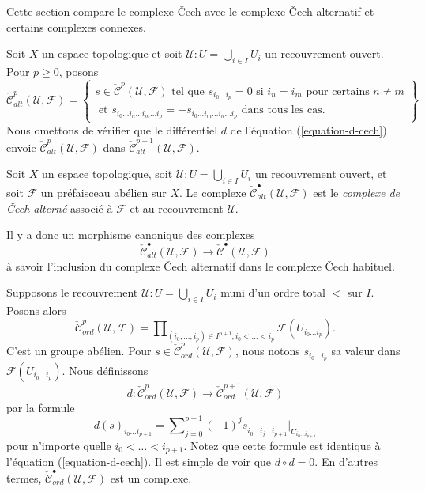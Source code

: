 \noindent
Cette section compare le complexe {\v C}ech avec le complexe {\v C}ech alternatif et certains complexes connexes.

\medskip\noindent
Soit $X$ un espace topologique et soit $\mathcal{U} : U = \bigcup_{i \in I} U_i$ un recouvrement ouvert. Pour $p \geq 0$, posons $$
\check{\mathcal{C}}_{alt}^p(\mathcal{U}, \mathcal{F})
=
\left\{
\begin{matrix}
s \in  \check{\mathcal{C}}^p(\mathcal{U}, \mathcal{F})
\text{ tel que }
s_{i_0 \ldots i_p} = 0 \text{ si } i_n = i_m \text{ pour certains } n \not = m\\
\text{ et }
s_{i_0\ldots i_n \ldots i_m \ldots i_p}
=
-s_{i_0\ldots i_m \ldots i_n \ldots i_p}
\text{ dans tous les cas.}
\end{matrix}
\right\}
$$ Nous omettons de vérifier que le différentiel $d$ de l'équation (\ref{equation-d-cech}) envoie $\check{\mathcal{C}}^p_{alt}(\mathcal{U}, \mathcal{F})$ dans $\check{\mathcal{C}}^{p + 1}_{alt}(\mathcal{U}, \mathcal{F})$.

\begin{definition}

\label{definition-alternating-cech-complex}
Soit $X$ un espace topologique, soit $\mathcal{U} : U = \bigcup_{i \in I} U_i$ un recouvrement ouvert, et soit $\mathcal{F}$ un préfaisceau abélien sur $X$. Le complexe $\check{\mathcal{C}}_{alt}^\bullet(\mathcal{U}, \mathcal{F})$ est le {\it complexe de {\v C}ech alterné} associé à $\mathcal{F}$ et au recouvrement $\mathcal{U}$.
\end{definition}

\noindent
Il y a donc un morphisme canonique des complexes $$
\check{\mathcal{C}}_{alt}^\bullet(\mathcal{U}, \mathcal{F})
\longrightarrow
\check{\mathcal{C}}^\bullet(\mathcal{U}, \mathcal{F})
$$ à savoir l'inclusion du complexe {\v C}ech alternatif dans le complexe {\v C}ech habituel.

\medskip\noindent
Supposons le recouvrement $\mathcal{U} : U = \bigcup_{i \in I} U_i$ muni d'un ordre total $<$ sur $I$. Posons alors $$
\check{\mathcal{C}}_{ord}^p(\mathcal{U}, \mathcal{F})
=
\prod\nolimits_{(i_0, \ldots, i_p) \in I^{p + 1}, i_0 < \ldots < i_p}
\mathcal{F}(U_{i_0\ldots i_p}).
$$ C'est un groupe abélien. Pour $s \in \check{\mathcal{C}}_{ord}^p(\mathcal{U}, \mathcal{F})$, nous notons $s_{i_0\ldots i_p}$ sa valeur dans $\mathcal{F}(U_{i_0\ldots i_p})$. Nous définissons $$
d : \check{\mathcal{C}}_{ord}^p(\mathcal{U}, \mathcal{F})
\longrightarrow
\check{\mathcal{C}}_{ord}^{p + 1}(\mathcal{U}, \mathcal{F})
$$ par la formule $$
d(s)_{i_0\ldots i_{p + 1}}
=
\sum\nolimits_{j = 0}^{p + 1}
(-1)^j
s_{i_0\ldots \hat i_j \ldots i_{p + 1}}|_{U_{i_0\ldots i_{p + 1}}}
$$ pour n'importe quelle $i_0 < \ldots < i_{p + 1}$. Notez que cette formule est identique à l'équation (\ref{equation-d-cech}). Il est simple de voir que $d \circ d = 0$. En d'autres termes, $\check{\mathcal{C}}_{ord}^\bullet(\mathcal{U}, \mathcal{F})$ est un complexe.

